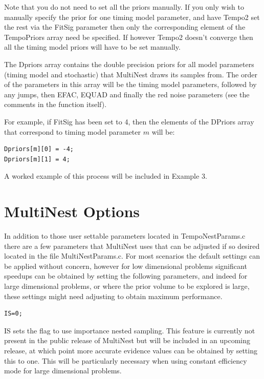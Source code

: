 \documentclass[%
 preprint,
 amsmath,amssymb,amsfonts,
 aps,
]{revtex4-1}
\begin{document}
Note that you do not need to set all the priors manually.  If you only wish to manually specify the prior for one timing model parameter, and have Tempo2 set the rest via the FitSig parameter then only the corresponding element of the TempoPriors array need be specified.  If however Tempo2 doesn't converge then all the timing model priors will have to be set manually.

The Dpriors array contains the double precision priors for all model parameters (timing model and stochastic) that MultiNest draws its samples from.  The order of the parameters in this array will be the timing model parameters, followed by any jumps, then EFAC, EQUAD and finally the red noise parameters (see the comments in the function itself).

For example, if FitSig has been set to 4, then the elements of the DPriors array that correspond to timing model parameter $m$ will be:

\begin{lstlisting}
Dpriors[m][0] = -4;
Dpriors[m][1] = 4;
\end{lstlisting}

A worked example of this process will be included in Example 3.


\section{MultiNest Options}
\label{Section:Advanced}

In addition to those user settable parameters located in TempoNestParams.c there are a few parameters that MultiNest uses that can be adjusted if so desired located in the file MultiNestParams.c.  For most scenarios the default settings can be applied without concern, however for low dimensional problems significant speedups can be obtained by setting the following parameters, and indeed for large dimensional problems, or where the prior volume to be explored is large, these settings might need adjusting to obtain maximum performance.

\begin{lstlisting}
IS=0;
\end{lstlisting}  
  
IS sets the flag to use importance nested sampling.  This feature is currently not present in the public release of MultiNest but will be included in an upcoming release, at which point more accurate evidence values can be obtained by setting this to one.  This will be particularly necessary when using constant efficiency mode for large dimensional problems.
\end{document}
